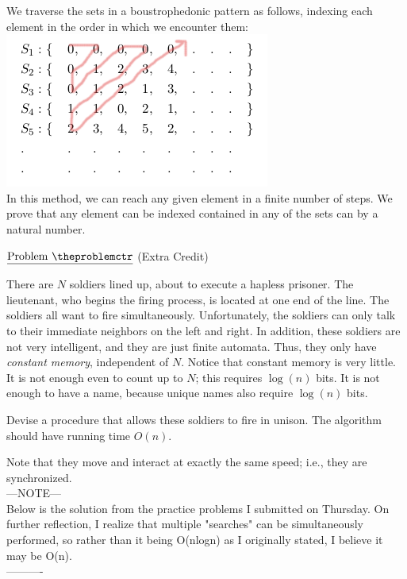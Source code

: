 \documentclass[11pt]{article}
\def\pp{\par\noindent}
\begin{document}
We traverse the sets in a boustrophedonic pattern as follows, indexing each element in the order in which we encounter them:\\
\includegraphics{boust.png}\\
In this method, we can reach any given element in a finite number of steps. We prove that any element can be indexed contained in any of the sets can by a natural number.

\addtocounter{problemctr}{1}
\bigskip
\noindent
$\underline{\rm Problem\ \theproblemctr}$ (Extra Credit)\pp
\noindent
There are $N$ soldiers lined up, about to execute a hapless
prisoner. The lieutenant, who begins the firing process, is
located at one end of the line. The soldiers all want to fire
simultaneously. Unfortunately, the soldiers can only talk to their
immediate neighbors on the left and right. In addition, these
soldiers are not very intelligent, and they are just finite automata.
Thus, they only have {\em constant
memory\/}, independent of $N$. Notice that constant memory is very
little. It is not enough even to count up to $N$; this requires
$\log (n)$ bits. It is not enough to have a name, because unique
names also require $\log (n)$ bits.

\noindent
Devise a procedure that allows these soldiers to fire in unison. The
algorithm should have running time $O(n)$.

\noindent
Note that they move and interact at exactly
the same speed; i.e., they are synchronized.\\

---NOTE---\\

Below is the solution from the practice problems I submitted on Thursday. On further reflection, I realize that multiple "searches" can be simultaneously performed, so rather than it being O(nlogn) as I originally stated, I believe it may be O(n).\\

----------\\
\end{document}
